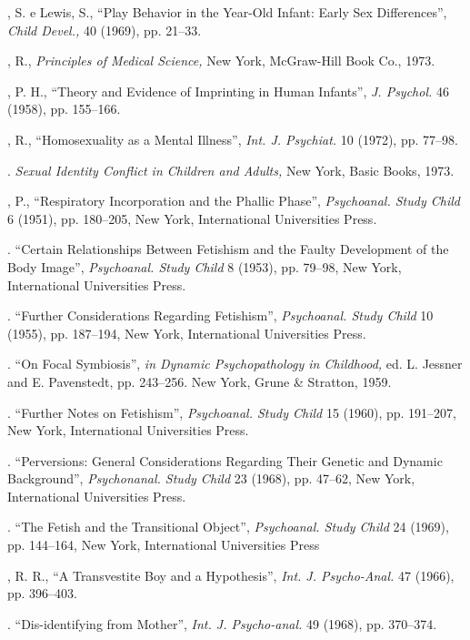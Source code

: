 \begin{description}
, S. e Lewis, S., ``Play Behavior in the Year-Old Infant:
Early Sex Differences'', \textit{Child Devel., }40 (1969), pp. 21--33.

, R., \textit{Principles of Medical Science, }New York, McGraw-Hill Book
Co., 1973.

, P. H., ``Theory and Evidence of Imprinting in Human
Infants'',\textit{ J. Psychol. } 46 (1958), pp. 155--166.

, R., ``Homosexuality as a Mental Illness'',
\textit{Int. J. Psychiat. }10 (1972), pp. 77--98.

. \textit{Sexual Identity Conflict in Children and Adults, }New
York, Basic Books, 1973.

, P., ``Respiratory Incorporation and the Phallic
Phase'', \textit{Psychoanal. Study Child } 6 (1951), pp. 180--205, New
York, International Universities Press.

. ``Certain Relationships Between Fetishism and the
Faulty Development of the Body Image'', \textit{Psychoanal. Study
Child }8 (1953), pp. 79--98, New York, International Universities Press.

. ``Further Considerations Regarding
Fetishism'', \textit{Psychoanal. Study Child }10 (1955), pp. 187--194,
New York, International Universities Press.

. ``On Focal Symbiosis'', \textit{in
Dynamic Psychopathology in Childhood, }ed. L. Jessner and E. Pavenstedt, pp.
243--256. New York, Grune \& Stratton, 1959.

. ``Further Notes on Fetishism'',
\textit{Psychoanal. Study Child } 15 (1960), pp. 191--207, New York, International
Universities Press.

. ``Perversions: General Considerations Regarding
Their Genetic and Dynamic Background'', \textit{Psychonanal. Study
Child }23 (1968), pp. 47--62, New York, International Universities Press.

. ``The Fetish and the Transitional
Object'', \textit{Psychoanal. Study Child } 24 (1969), pp. 144--164,
New York, International Universities Press

, R. R., ``A Transvestite Boy and a
Hypothesis'', \textit{Int. J. Psycho-Anal. } 47 (1966), pp. 396--403.

. ``Dis-identifying from Mother'',
\textit{ Int. J. Psycho-anal. } 49 (1968), pp. 370--374.


\end{description}

